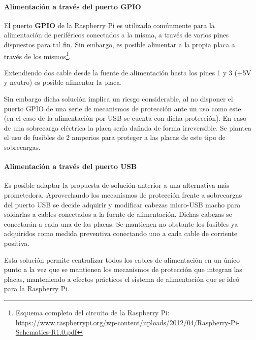 \paragraph{Alimentación a través del puerto GPIO\\}

El puerto \textbf{GPIO} de la Raspberry Pi es utilizado comúnmente para la alimentación de periféricos conectados a la misma, a través de varios pines dispuestos para tal fin. Sin embargo, es posible alimentar a la propia placa a través de los mismos\footnote{Esquema completo del circuito de la Raspberry Pi: \href{https://www.raspberrypi.org/wp-content/uploads/2012/04/Raspberry-Pi-Schematics-R1.0.pdf}{https://www.raspberrypi.org/wp-content/uploads/2012/04/Raspberry-Pi-Schematics-R1.0.pdf}}.%



Extendiendo dos cable desde la fuente de alimentación hasta los pines 1 y 3 (+5V y neutro) es posible alimentar la placa.

Sin embargo dicha solución implica un riesgo considerable, al no disponer el puerto GPIO de una serie de mecanismos de protección ante un uso como este (en el caso de la alimentación por USB se cuenta con dicha protección). En caso de una sobrecarga eléctrica la placa sería dañada de forma irreversible. Se plantea el uso de fusibles de 2 amperios para proteger a las placas de este tipo de sobrecargas.

\paragraph{Alimentación a través del puerto USB\\}

Es posible adaptar la propuesta de solución anterior a una alternativa más prometedora. Aprovechando los mecanismos de protección frente a sobrecargas del puerto USB se decide adquirir y modificar cabezas micro-USB macho para soldarlas a cables conectados a la fuente de alimentación. Dichas cabezas se conectarán a cada una de las placas. Se mantienen no obstante los fusibles ya adquiridos como medida preventiva conectando uno a cada cable de corriente positiva.

Esta solución permite centralizar todos los cables de alimentación en un único punto a la vez que se mantienen los mecanismos de protección que integran las placas, manteniendo a efectos prácticos el sistema de alimentación que se ideó para la Raspberry Pi.

